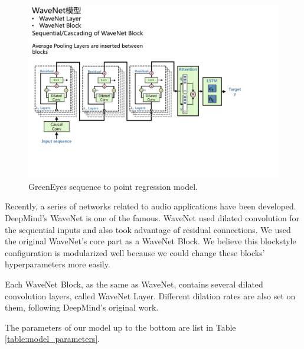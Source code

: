 \begin{figure}[!htbp]
    \centering
    \includegraphics[width=\linewidth]{graphs/WaveNet_LSTM.pdf}
    \caption{GreenEyes sequence to point regression model.}
    \label{fig:greeneyes_model}
\end{figure}

Recently, a series of networks related to audio applications have been developed. DeepMind's WaveNet \cite{oord2016wavenet} is one of the famous. WaveNet used dilated convolution for the sequential inputs and also took advantage of residual connections. We used the original WaveNet's core part as a WaveNet Block. We believe this block\-style configuration is modularized well because we could change these blocks' hyperparameters more easily.

Each WaveNet Block, as the same as WaveNet, contains several dilated convolution layers, called WaveNet Layer. Different dilation rates are also set on them, following DeepMind's original work.

The parameters of our model up to the bottom are list in Table \ref{table:model_parameters}.

